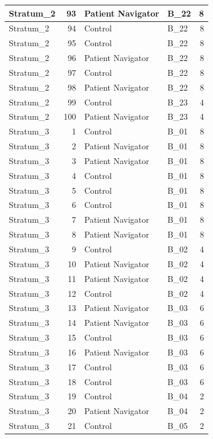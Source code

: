 \documentclass[
]{book}
\begin{document}
\begin{table}[H]
\begin{tabular}{l|r|l|l|r}
\hline
Stratum\_2 & 93 & Patient Navigator & B\_22 & 8\\
\hline
Stratum\_2 & 94 & Control & B\_22 & 8\\
\hline
Stratum\_2 & 95 & Control & B\_22 & 8\\
\hline
Stratum\_2 & 96 & Patient Navigator & B\_22 & 8\\
\hline
Stratum\_2 & 97 & Control & B\_22 & 8\\
\hline
Stratum\_2 & 98 & Patient Navigator & B\_22 & 8\\
\hline
Stratum\_2 & 99 & Control & B\_23 & 4\\
\hline
Stratum\_2 & 100 & Patient Navigator & B\_23 & 4\\
\hline
Stratum\_3 & 1 & Control & B\_01 & 8\\
\hline
Stratum\_3 & 2 & Patient Navigator & B\_01 & 8\\
\hline
Stratum\_3 & 3 & Patient Navigator & B\_01 & 8\\
\hline
Stratum\_3 & 4 & Control & B\_01 & 8\\
\hline
Stratum\_3 & 5 & Control & B\_01 & 8\\
\hline
Stratum\_3 & 6 & Control & B\_01 & 8\\
\hline
Stratum\_3 & 7 & Patient Navigator & B\_01 & 8\\
\hline
Stratum\_3 & 8 & Patient Navigator & B\_01 & 8\\
\hline
Stratum\_3 & 9 & Control & B\_02 & 4\\
\hline
Stratum\_3 & 10 & Patient Navigator & B\_02 & 4\\
\hline
Stratum\_3 & 11 & Patient Navigator & B\_02 & 4\\
\hline
Stratum\_3 & 12 & Control & B\_02 & 4\\
\hline
Stratum\_3 & 13 & Patient Navigator & B\_03 & 6\\
\hline
Stratum\_3 & 14 & Patient Navigator & B\_03 & 6\\
\hline
Stratum\_3 & 15 & Control & B\_03 & 6\\
\hline
Stratum\_3 & 16 & Patient Navigator & B\_03 & 6\\
\hline
Stratum\_3 & 17 & Control & B\_03 & 6\\
\hline
Stratum\_3 & 18 & Control & B\_03 & 6\\
\hline
Stratum\_3 & 19 & Control & B\_04 & 2\\
\hline
Stratum\_3 & 20 & Patient Navigator & B\_04 & 2\\
\hline
Stratum\_3 & 21 & Control & B\_05 & 2\\

\end{tabular}
\end{table}
\end{document}
